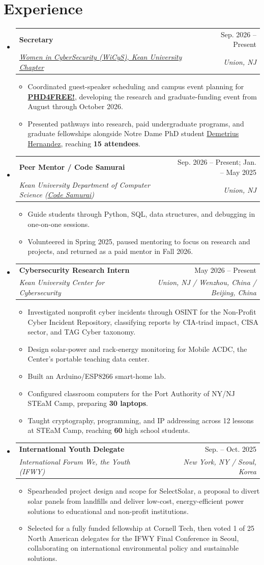 \documentclass[letterpaper,11pt]{article}
\makeatletter
\newcommand{\resumeItem}[1]{
  \item\small{#1}
}
\newcommand{\resumeSubheading}[4]{
  \vspace{-1pt}\item
    \begin{tabular*}{0.97\textwidth}[t]{l@{\extracolsep{\fill}}r}
      {\normalsize\textbf{#1}} & {\normalsize #2} \\
      \textit{\small#3} & \textit{\small #4} \\
    \end{tabular*}\vspace{-7pt}
}
\newcommand{\resumeSubHeadingListStart}{\begin{itemize}[leftmargin=0.15in, label={}, topsep=0pt, partopsep=0pt, itemsep=0pt]\small}
\newcommand{\resumeSubHeadingListEnd}{\end{itemize}}
\newcommand{\resumeItemListStart}{\begin{itemize}[topsep=2pt, itemsep=-2pt, parsep=0pt]}
\newcommand{\resumeItemListEnd}{\end{itemize}\vspace{-6pt}}
\makeatother
\begin{document}
\section{Experience}
  \resumeSubHeadingListStart
    \resumeSubheading
      {Secretary}{Sep. 2026 -- Present}
      {\href{https://kean.campuslabs.com/engage/organization/wicyskean}{Women in CyberSecurity (WiCyS), Kean University Chapter}}{Union, NJ}
      \resumeItemListStart
        \resumeItem{Coordinated guest-speaker scheduling and campus event planning for \href{https://kean.campuslabs.com/engage/event/12870047}{\textbf{PHD4FREE!}}, developing the research and graduate-funding event from August through October 2026.}
        \resumeItem{Presented pathways into research, paid undergraduate programs, and graduate fellowships alongside Notre Dame PhD student \href{https://www.linkedin.com/in/demetrius-hernandez/}{Demetrius Hernandez}, reaching \textbf{15 attendees}.}
      \resumeItemListEnd

    \resumeSubheading
      {Peer Mentor / Code Samurai}{Sep. 2026 -- Present; Jan. -- May 2025}
      {Kean University Department of Computer Science (\href{https://yoda.kean.edu/~samurai/}{\underline{Code Samurai}})}{Union, NJ}
      \resumeItemListStart
        \resumeItem{Guide students through Python, SQL, data structures, and debugging in one-on-one sessions.}
        \resumeItem{Volunteered in Spring 2025, paused mentoring to focus on research and projects, and returned as a paid mentor in Fall 2026.}
      \resumeItemListEnd

    \resumeSubheading
      {Cybersecurity Research Intern}{May 2026 -- Present}
      {Kean University Center for Cybersecurity}{Union, NJ / Wenzhou, China / Beijing, China}
      \resumeItemListStart
        \resumeItem{Investigated nonprofit cyber incidents through OSINT for the Non-Profit Cyber Incident Repository, classifying reports by CIA-triad impact, CISA sector, and TAG Cyber taxonomy.}
        \resumeItem{Design solar-power and rack-energy monitoring for Mobile ACDC, the Center's portable teaching data center.}
        \resumeItem{Built an Arduino/ESP8266 smart-home lab.}
        \resumeItem{Configured classroom computers for the Port Authority of NY/NJ STEaM Camp, preparing \textbf{30 laptops}.}
        \resumeItem{Taught cryptography, programming, and IP addressing across 12 lessons at STEaM Camp, reaching \textbf{60} high school students.}
      \resumeItemListEnd

    \resumeSubheading
      {International Youth Delegate}{Sep. -- Oct. 2025}
      {International Forum We, the Youth (IFWY)}{New York, NY / Seoul, Korea}
      \resumeItemListStart
        \resumeItem{Spearheaded project design and scope for SelectSolar, a proposal to divert solar panels from landfills and deliver low-cost, energy-efficient power solutions to educational and non-profit institutions.}
        \resumeItem{Selected for a fully funded fellowship at Cornell Tech, then voted 1 of 25 North American delegates for the IFWY Final Conference in Seoul, collaborating on international environmental policy and sustainable solutions.}
      \resumeItemListEnd
  \resumeSubHeadingListEnd
\end{document}
